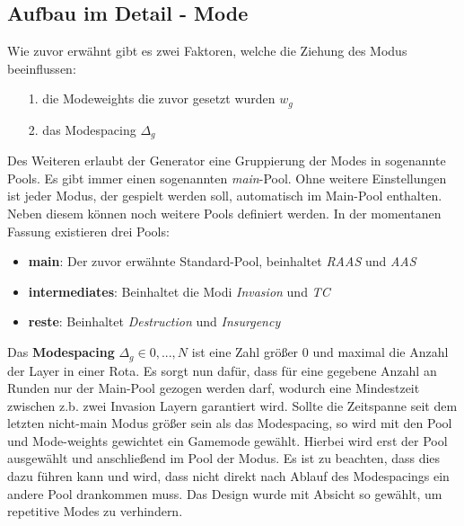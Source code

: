     \subsection{Aufbau im Detail - Mode}
        Wie zuvor erwähnt gibt es zwei Faktoren, welche die Ziehung des Modus beeinflussen:
        \begin{itemize}
            \item [1.] die Modeweights die zuvor gesetzt wurden $w_g$ 
            \item [2.] das Modespacing $\Delta_g$
        \end{itemize}
        Des Weiteren erlaubt der Generator eine Gruppierung der Modes in sogenannte \glqq{}Pools\grqq{}. 
        Es gibt immer einen sogenannten \textit{main}-Pool. 
        Ohne weitere Einstellungen ist jeder Modus, der gespielt werden soll, automatisch im Main-Pool enthalten. 
        Neben diesem können noch weitere Pools definiert werden. 
        In der momentanen Fassung existieren drei Pools:
        \begin{itemize}
            \item \textbf{main}: Der zuvor erwähnte Standard-Pool, beinhaltet \textit{RAAS} und \textit{AAS}
            \item \textbf{intermediates}: Beinhaltet die Modi \textit{Invasion} und \textit{TC}
            \item \textbf{reste}: Beinhaltet \textit{Destruction} und \textit{Insurgency}
        \end{itemize}

        Das \textbf{Modespacing} $\Delta_g\in{0,...,N}$ ist eine Zahl größer $0$ und maximal die Anzahl der Layer in einer Rota.
        Es sorgt nun dafür, dass für eine gegebene Anzahl an Runden nur der Main-Pool gezogen werden darf, wodurch eine \glqq{}Mindestzeit\grqq{} zwischen z.b. zwei Invasion Layern garantiert wird.
        Sollte die Zeitspanne seit dem letzten nicht-main Modus größer sein als das Modespacing, so wird mit den Pool und Mode-weights gewichtet ein Gamemode gewählt. 
        Hierbei wird erst der Pool ausgewählt und anschließend im Pool der Modus. 
        Es ist zu beachten, dass dies dazu führen kann und wird, dass nicht direkt nach Ablauf des Modespacings ein andere Pool drankommen muss. 
        Das Design wurde mit Absicht so gewählt, um repetitive Modes zu verhindern.

